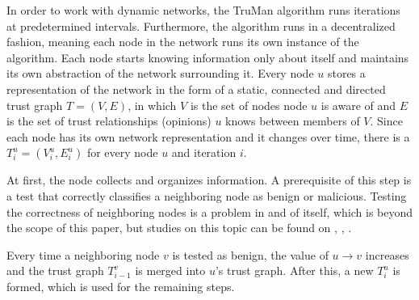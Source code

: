 \documentclass[conference]{IEEEtran}
\begin{document}

In order to work with dynamic networks, the TruMan algorithm runs iterations at predetermined intervals.
Furthermore, the algorithm runs in a decentralized fashion, meaning each node in the network runs its own instance of the algorithm.
Each node starts knowing information only about itself and maintains its own abstraction of the network surrounding it.
Every node $u$ stores a representation of the network in the form of a static, connected and directed trust graph $T = (V, E)$, in which $V$ is the set of nodes node $u$ is aware of and $E$ is the set of trust relationships (opinions) $u$ knows between members of $V$.
Since each node has its own network representation and it changes over time, there is a $T^u_i = (V^u_i, E^u_i)$ for every node $u$ and iteration $i$.



At first, the node collects and organizes information.
A prerequisite of this step is a test that correctly classifies a neighboring node as benign or malicious.
Testing the correctness of neighboring nodes is a problem in and of itself, which is beyond the scope of this paper, but studies on this topic can be found on \cite{golle2004detecting}, \cite{li2016defective}, \cite{kerrache2016detection}.


Every time a neighboring node $v$ is tested as benign, the value of $u \rightarrow v$ increases and the trust graph $T^v_{i-1}$ is merged into $u$'s trust graph.
After this, a new $T^u_i$ is formed, which is used for the remaining steps.
\end{document}
